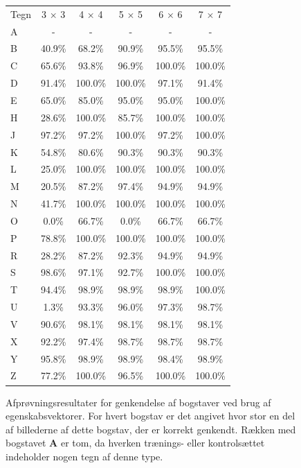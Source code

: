 \begin{figure}[htp]
\centering
\begin{tabular}{|l|c|c|c|c|c|}\hline
\rowcolor[gray]{0.9} \multicolumn{6}{|>{\columncolor[gray]{0.9}}c|}{\textbf{Genkendelse af bogstaver - Egenskabsvektor}} \\ \hline
Tegn & 3 $\times$ 3 & 4 $\times$ 4 & 5 $\times$ 5 & 6 $\times$ 6 & 7 $\times$ 7\\\hline
A & - & - & - & - & -\\\hline
B & 40.9\% & 68.2\% & 90.9\% & 95.5\% & 95.5\%\\\hline
C & 65.6\% & 93.8\% & 96.9\% & 100.0\% & 100.0\%\\\hline
D & 91.4\% & 100.0\% & 100.0\% & 97.1\% & 91.4\%\\\hline
E & 65.0\% & 85.0\% & 95.0\% & 95.0\% & 100.0\%\\\hline
H & 28.6\% & 100.0\% & 85.7\% & 100.0\% & 100.0\%\\\hline
J & 97.2\% & 97.2\% & 100.0\% & 97.2\% & 100.0\%\\\hline
K & 54.8\% & 80.6\% & 90.3\% & 90.3\% & 90.3\%\\\hline
L & 25.0\% & 100.0\% & 100.0\% & 100.0\% & 100.0\%\\\hline
M & 20.5\% & 87.2\% & 97.4\% & 94.9\% & 94.9\%\\\hline
N & 41.7\% & 100.0\% & 100.0\% & 100.0\% & 100.0\%\\\hline
O & 0.0\% & 66.7\% & 0.0\%  & 66.7\% & 66.7\%\\\hline
P & 78.8\% & 100.0\% & 100.0\% & 100.0\% & 100.0\%\\\hline
R & 28.2\% & 87.2\% & 92.3\% & 94.9\% & 94.9\%\\\hline
S & 98.6\% & 97.1\% & 92.7\% & 100.0\% & 100.0\%\\\hline
T & 94.4\% & 98.9\% & 98.9\% & 98.9\% & 100.0\%\\\hline
U & 1.3\% & 93.3\% & 96.0\% & 97.3\% & 98.7\%\\\hline
V & 90.6\% & 98.1\% & 98.1\% & 98.1\% & 98.1\%\\\hline
X & 92.2\% & 97.4\% & 98.7\% & 98.7\% & 98.7\%\\\hline
Y & 95.8\% & 98.9\% & 98.9\% & 98.4\% & 98.9\%\\\hline
Z & 77.2\% & 100.0\% & 96.5\% & 100.0\% & 100.0\%\\\hline
\end{tabular}
\caption{Afprøvningsresultater for genkendelse af bogstaver ved brug af egenskabsvektorer. For hvert bogstav er det angivet hvor stor en del af billederne af dette bogstav, der er korrekt genkendt. Rækken med bogstavet \textbf{A} er tom, da hverken trænings- eller kontrolsættet indeholder nogen tegn af denne type.}
\label{fig:test:middel_bogstav}
\end{figure}


